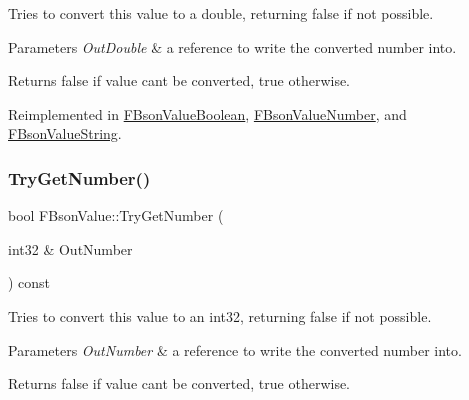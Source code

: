 Tries to convert this value to a double, returning false if not possible.


\begin{DoxyParams}{Parameters}
{\em Out\+Double} & a reference to write the converted number into. \\
\hline
\end{DoxyParams}
\begin{DoxyReturn}{Returns}
false if value can\textquotesingle{}t be converted, true otherwise. 
\end{DoxyReturn}


Reimplemented in \mbox{\hyperlink{class_f_bson_value_boolean_a7c46553a8c6caaec96ce0821977ee1e7}{F\+Bson\+Value\+Boolean}}, \mbox{\hyperlink{class_f_bson_value_number_a6e5788ee9637c76e073c6336f1b3d263}{F\+Bson\+Value\+Number}}, and \mbox{\hyperlink{class_f_bson_value_string_a7346681867daa27d7fa4a4e690ba55aa}{F\+Bson\+Value\+String}}.

\mbox{\label{class_f_bson_value_a74a23bce29e9f699d0fde83663c4b3a8}} 
\subsubsection{\texorpdfstring{Try\+Get\+Number()}{TryGetNumber()}\hspace{0.1cm}{\footnotesize\ttfamily [2/4]}}
{\footnotesize\ttfamily bool F\+Bson\+Value\+::\+Try\+Get\+Number (\begin{DoxyParamCaption}\item[{int32 \&}]{Out\+Number }\end{DoxyParamCaption}) const}

Tries to convert this value to an int32, returning false if not possible.


\begin{DoxyParams}{Parameters}
{\em Out\+Number} & a reference to write the converted number into. \\
\hline
\end{DoxyParams}
\begin{DoxyReturn}{Returns}
false if value can\textquotesingle{}t be converted, true otherwise. 
\end{DoxyReturn}
\mbox{\label{class_f_bson_value_a5e61aa31b7c06178502e367957908e8c}} 
